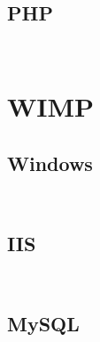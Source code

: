 \section{PHP}


\begin{lstlisting}[language=bash]

\end{lstlisting}



\begin{lstlisting}[language=bash]

\end{lstlisting}


\chapter{WIMP}



\section{Windows}



\begin{lstlisting}[language=bash]

\end{lstlisting}



\begin{lstlisting}[language=bash]

\end{lstlisting}


\section{IIS}



\begin{lstlisting}[language=bash]

\end{lstlisting}



\begin{lstlisting}[language=bash]

\end{lstlisting}


\section{MySQL}




